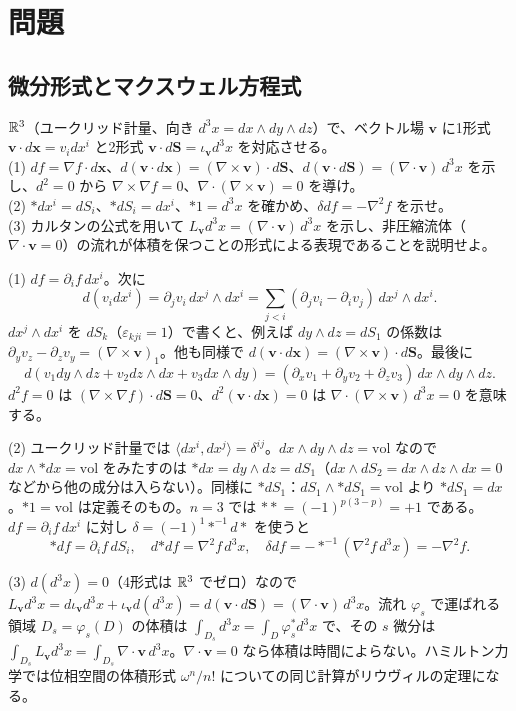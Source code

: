 \section{問題}

\subsection{微分形式とマクスウェル方程式}

\begin{problem}[難易度 A]\label{ch05-prob-r3}
$\mathbb{R}^3$（ユークリッド計量、向き $d^3x=dx\wedge dy\wedge dz$）で、ベクトル場 $\bm v$ に1形式 $\bm v\cdot d\bm x=v_idx^i$ と2形式 $\bm v\cdot d\bm S=\iota_{\bm v}d^3x$ を対応させる。\\
(1) $df=\nabla f\cdot d\bm x$、$d(\bm v\cdot d\bm x)=(\nabla\times\bm v)\cdot d\bm S$、$d(\bm v\cdot d\bm S)=(\nabla\cdot\bm v)\,d^3x$ を示し、$d^2=0$ から $\nabla\times\nabla f=0$、$\nabla\cdot(\nabla\times\bm v)=0$ を導け。\\
(2) ${*}dx^i=dS_i$、${*}dS_i=dx^i$、${*}1=d^3x$ を確かめ、$\delta df=-\nabla^2f$ を示せ。\\
(3) カルタンの公式を用いて $L_{\bm v}d^3x=(\nabla\cdot\bm v)\,d^3x$ を示し、非圧縮流体（$\nabla\cdot\bm v=0$）の流れが体積を保つことの形式による表現であることを説明せよ。
\end{problem}

\begin{solution}
(1) $df=\partial_if\,dx^i$。次に
\[
d(v_idx^i)=\partial_jv_i\,dx^j\wedge dx^i=\sum_{j<i}(\partial_jv_i-\partial_iv_j)\,dx^j\wedge dx^i .
\]
$dx^j\wedge dx^i$ を $dS_k$（$\varepsilon_{kji}=1$）で書くと、例えば $dy\wedge dz=dS_1$ の係数は $\partial_yv_z-\partial_zv_y=(\nabla\times\bm v)_1$。他も同様で $d(\bm v\cdot d\bm x)=(\nabla\times\bm v)\cdot d\bm S$。最後に
\[
d(v_1dy\wedge dz+v_2dz\wedge dx+v_3dx\wedge dy)=(\partial_xv_1+\partial_yv_2+\partial_zv_3)\,dx\wedge dy\wedge dz .
\]
$d^2f=0$ は $(\nabla\times\nabla f)\cdot d\bm S=0$、$d^2(\bm v\cdot d\bm x)=0$ は $\nabla\cdot(\nabla\times\bm v)\,d^3x=0$ を意味する。

(2) ユークリッド計量では $\langle dx^i,dx^j\rangle=\delta^{ij}$。$dx\wedge dy\wedge dz=\mathrm{vol}$ なので $dx\wedge{*dx}=\mathrm{vol}$ をみたすのは ${*dx}=dy\wedge dz=dS_1$（$dx\wedge dS_2=dx\wedge dz\wedge dx=0$ などから他の成分は入らない）。同様に ${*}dS_1$：$dS_1\wedge{*dS_1}=\mathrm{vol}$ より ${*}dS_1=dx$。${*}1=\mathrm{vol}$ は定義そのもの。$n=3$ では ${**}=(-1)^{p(3-p)}=+1$ である。
$df=\partial_if\,dx^i$ に対し $\delta=(-1)^1{*}^{-1}d{*}$ を使うと
\[
{*df}=\partial_if\,dS_i,\quad d{*df}=\nabla^2f\,d^3x,\quad \delta df=-{*}^{-1}(\nabla^2f\,d^3x)=-\nabla^2f .
\]

(3) $d(d^3x)=0$（4形式は $\mathbb{R}^3$ でゼロ）なので $L_{\bm v}d^3x=d\iota_{\bm v}d^3x+\iota_{\bm v}d(d^3x)=d(\bm v\cdot d\bm S)=(\nabla\cdot\bm v)\,d^3x$。流れ $\varphi_s$ で運ばれる領域 $D_s=\varphi_s(D)$ の体積は $\int_{D_s}d^3x=\int_D\varphi_s^*d^3x$ で、その $s$ 微分は $\int_{D_s}L_{\bm v}d^3x=\int_{D_s}\nabla\cdot\bm v\,d^3x$。$\nabla\cdot\bm v=0$ なら体積は時間によらない。ハミルトン力学では位相空間の体積形式 $\omega^n/n!$ についての同じ計算がリウヴィルの定理になる。
\end{solution}

